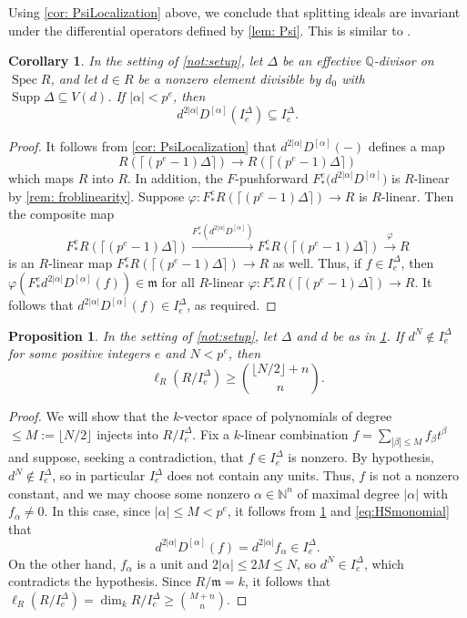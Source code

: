\documentclass[11pt,leqno]{amsart}
\numberwithin{equation}{section}
\newtheorem{proposition}[theorem]{Proposition}
\newtheorem{corollary}[theorem]{Corollary}
\theoremstyle{definition}
\theoremstyle{remark}
\newcommand{\N}{\mathbb{N}}
\newcommand{\Q}{\mathbb{Q}}
\newcommand{\Spec}{\operatorname{Spec}}
\newcommand{\lre}{\longrightarrow}
\providecommand{\frm}{}
\renewcommand{\frm}{\mathfrak{m}}
\newcommand{\Supp}{\operatorname{Supp}}
\begin{document}
Using \cref{cor: PsiLocalization} above, we conclude that splitting ideals are invariant under the differential operators defined by \cref{lem: Psi}. This is similar to \cite[Proposition 5.10]{BJN19}.

\begin{corollary} \label{cor: splittingidealinclusions}
In the setting of \cref{not:setup}, let $\Delta$ be an effective $\Q$-divisor on $\Spec R$, and let $d \in R$ be a nonzero element divisible by $d_0$ with $\Supp \Delta \subseteq V(d)$. If $|\alpha| < p^e$, then $$d^{2|\alpha|}D^{[\alpha]}(I^\Delta_e) \subseteq I^\Delta_e.$$
\end{corollary}
\begin{proof}
    It follows from \cref{cor: PsiLocalization} that $d^{2|\alpha|}D^{[\alpha]}(-)$ defines a map $$ R(\lceil (p^e - 1)\Delta \rceil)  \lre R(\lceil (p^e - 1)\Delta \rceil)$$ which maps $R$ into $R$. In addition, the $F$-pushforward $F^e_*\big(d^{2|\alpha|}D^{[\alpha]}\big)$ is $R$-linear by \cref{rem: froblinearity}. Suppose $\varphi: F^e_* R(\lceil (p^e - 1)\Delta \rceil) \to R$ is $R$-linear. Then the composite map $$F^e_* R(\lceil (p^e - 1)\Delta \rceil) \stackrel{F^e_* (d^{2|\alpha|}D^{[\alpha]})}\longrightarrow F^e_*R(\lceil (p^e - 1)\Delta \rceil) \stackrel{\varphi}\longrightarrow R$$ is an $R$-linear map $ F^e_* R(\lceil (p^e - 1)\Delta \rceil) \to R$ as well. Thus, if $f \in I^\Delta_e$, then $\varphi(F^e_* d^{2|\alpha|} D^{[\alpha]}(f)) \in \mathfrak{m}$ for all $R$-linear $\varphi:  F^e_* R(\lceil (p^e - 1)\Delta \rceil) \to R$. It follows that $d^{2|\alpha|} D^{[\alpha]}(f) \in I^\Delta_e$, as required.
\end{proof}
\begin{proposition} \label{prop: colengthbound}
In the setting of \cref{not:setup}, let $\Delta$ and $d$ be as in \cref{cor: splittingidealinclusions}. If $d^N \notin I^\Delta_e$ for some positive integers $e$ and $N < p^e$, then $$\ell_R(R/I^\Delta_e) \geq \binom{\lfloor N/2 \rfloor+ n}{n}.$$
\end{proposition}
\begin{proof}
We will show that the $k$-vector space of polynomials of degree $\leq M := \lfloor N/2 \rfloor$ injects into $R/I_e^{\Delta}$. Fix a $k$-linear combination $f = \sum_{|\beta| \leq M} f_\beta t^\beta$ and suppose, seeking a contradiction, that $f \in I_e^\Delta$ is nonzero. By hypothesis, $d^N \notin I_e^\Delta$, so in particular $I_e^\Delta$ does not contain any units. Thus, $f$ is not a nonzero constant, and we may choose some nonzero $\alpha \in \N^n$ of maximal degree $|\alpha|$ with $f_\alpha \neq 0$. In this case, since $|\alpha| \leq M < p^e$, it follows from \cref{cor: splittingidealinclusions} and \cref{eq:HSmonomial} that $$d^{2|\alpha|}D^{[\alpha]}(f) = d^{2|\alpha|}f_{\alpha} \in I^\Delta_e.$$ On the other hand, $f_\alpha$ is a unit and $2|\alpha| \leq 2M \leq N$, so $d^N \in I^\Delta_e$, which contradicts the hypothesis. Since $R/\frm = k$, it follows that $\ell_R(R/I^\Delta_e) = \dim_k R/I^\Delta_e \geq \binom{M + n}{n}$.
\end{proof}
\end{document}
